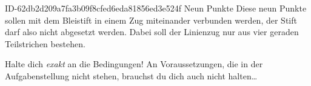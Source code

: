\begin{exercise}
      {ID-62db2d209a7fa3b09f8cfed6eda81856ed3e524f}
      {Neun Punkte}
  \ifproblem\problem
    Diese neun Punkte sollen mit dem Bleistift in einem Zug miteinander
    verbunden werden, der Stift darf also nicht abgesetzt werden.
    Dabei soll der Linienzug nur aus vier geraden Teilstrichen bestehen.
    \begin{center}
    \end{center}
  \fi
  \ifoutline\outline
    Halte dich \emph{exakt} an die Bedingungen! An Voraussetzungen, die
    in der Aufgabenstellung nicht stehen, brauchst du dich auch
    nicht halten\ldots
  \fi
\end{exercise}
